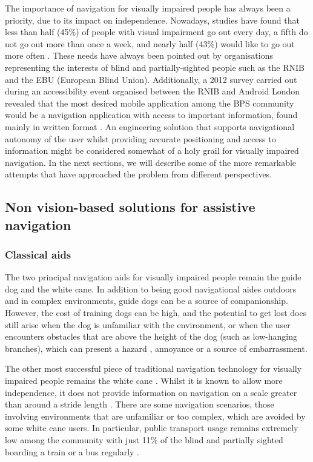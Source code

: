 The importance of navigation for visually impaired people has always been a priority, due to its impact on independence. Nowadays, studies have found that less than half (45\%) of people with visual impairment go out every day, a fifth do not go out more than once a week, and nearly half (43\%) would like to go out more often \citep{douglas2006network}.  These needs have always been pointed out by organisations representing the interests of blind and partially-sighted people such as the RNIB and the EBU (European Blind Union). Additionally, a 2012 survey carried out during an accessibility event organised between the RNIB and Android London revealed that the most desired mobile application among the BPS community would be a navigation application with access to important information, found mainly in written format \citep{RNIB2012}. An engineering solution that supports navigational autonomy of the user whilst providing accurate positioning and access to information might be considered somewhat of a holy grail for visually impaired navigation. In the next sections, we will describe some of the more remarkable attempts that have approached the problem from different perspectives.




\subsection{Non vision-based solutions for assistive navigation}

\subsubsection{Classical aids}

The two principal navigation aids for visually impaired people remain the guide dog and the white cane.  In addition to being good navigational aides outdoors and in complex environments, guide dogs can be a source of companionship. However, the cost of training dogs can be high, and the potential to get lost does still arise when the dog is unfamiliar with the environment, or when the user encounters obstacles that are above the height of the dog (such as low-hanging branches), which can present a hazard \citep{manduchi2011mobility}, annoyance or a source of embarrassment. 

The other most successful piece of traditional navigation technology for visually impaired people remains the white cane \citep{roentgen2008inventory}.  Whilst it is known to allow more independence, it does not provide information on navigation on a scale greater than around a stride length \citep{maidenbaum2013increasing}. There are some navigation scenarios, those involving environments that are unfamiliar or too complex, which are avoided by some white cane users. In particular, public transport usage remains extremely low among the community with just 11\% of the blind and partially sighted boarding a train or a bus regularly \citep{Pey2006}.

